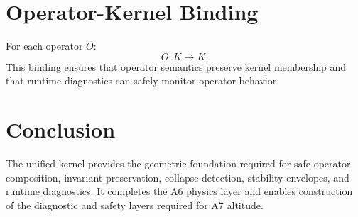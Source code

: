 \documentclass[11pt]{article}
\begin{document}
\section{Operator-Kernel Binding}
For each operator $O$:
\[
O : K \to K.
\]
This binding ensures that operator semantics preserve kernel membership and that
runtime diagnostics can safely monitor operator behavior.

\section*{Conclusion}
The unified kernel provides the geometric foundation required for safe operator
composition, invariant preservation, collapse detection, stability envelopes,
and runtime diagnostics. It completes the A6 physics layer and enables
construction of the diagnostic and safety layers required for A7 altitude.
\end{document}
